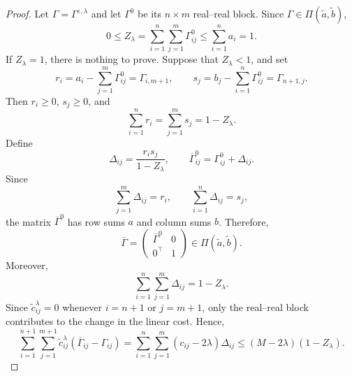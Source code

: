 \documentclass[a4paper,11pt]{article}
\numberwithin{equation}{section}
\newcommand{\eps}{\varepsilon}
\begin{document}
\begin{proof}
Let $\Gamma = \Gamma^{\eps,\lambda}$ and let $\Gamma^0$ be its $n\times m$ real--real block. Since $\Gamma\in\Pi(\widetilde a,\widetilde b)$,
\begin{equation*}
  0 \leq Z_{\lambda}=\sum_{i=1}^{n}\sum_{j=1}^{m}\Gamma^0_{ij} \leq \sum_{i=1}^{n}a_i=1.
\end{equation*}
If $Z_{\lambda}=1$, there is nothing to prove. Suppose that $Z_{\lambda}<1$, and set
\begin{equation*}
  r_i = a_i-\sum_{j=1}^{m}\Gamma^0_{ij}=\Gamma_{i,m+1},\qquad s_j = b_j-\sum_{i=1}^{n}\Gamma^0_{ij}=\Gamma_{n+1,j}.
\end{equation*}
Then $r_i\geq0$, $s_j\geq0$, and
\begin{equation*}
  \sum_{i=1}^{n}r_i=\sum_{j=1}^{m}s_j=1-Z_{\lambda}.
\end{equation*}
Define
\begin{equation*}
  \Delta_{ij}=\frac{r_i s_j}{1-Z_{\lambda}},\qquad \overline\Gamma^0_{ij}=\Gamma^0_{ij}+\Delta_{ij}.
\end{equation*}
Since
\begin{equation*}
  \sum_{j=1}^{m}\Delta_{ij}=r_i,\qquad \sum_{i=1}^{n}\Delta_{ij}=s_j,
\end{equation*}
the matrix $\overline\Gamma^0$ has row sums $a$ and column sums $b$. Therefore,
\begin{equation*}
  \overline\Gamma =
  \begin{pmatrix}
    \overline\Gamma^0 & 0\\
    0^{\top} & 1
  \end{pmatrix}
  \in\Pi(\widetilde a,\widetilde b).
\end{equation*}
Moreover,
\begin{equation*}
  \sum_{i=1}^{n}\sum_{j=1}^{m}\Delta_{ij}=1-Z_{\lambda}.
\end{equation*}
Since $\widetilde c^\lambda_{ij}=0$ whenever $i=n+1$ or $j=m+1$, only the real--real block contributes to the change in the linear cost. Hence,
\begin{equation}\label{eq:mass-linear-estimate}
  \sum_{i = 1}^{n + 1}\sum_{j = 1}^{m + 1}\widetilde c^\lambda_{ij}(\overline\Gamma_{ij}-\Gamma_{ij}) = \sum_{i = 1}^{n}\sum_{j = 1}^{m}(c_{ij}-2\lambda)\Delta_{ij} \leq (M-2\lambda)(1-Z_{\lambda}).
\end{equation}


\end{proof}
\end{document}
